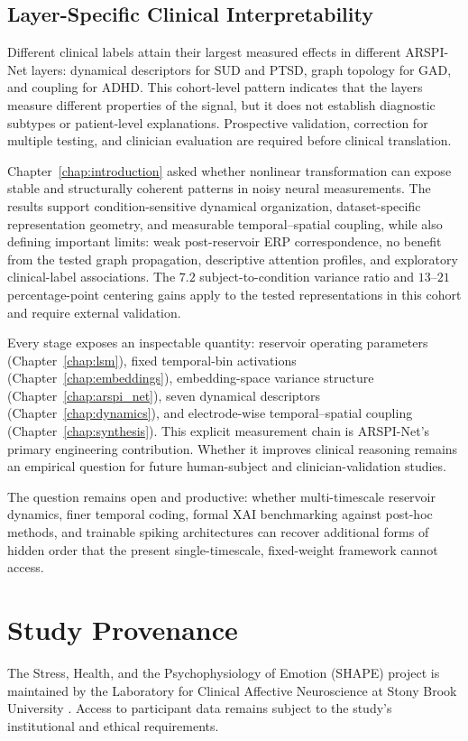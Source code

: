 \subsection{Layer-Specific Clinical Interpretability}

Different clinical labels attain their largest measured effects in different ARSPI-Net layers: dynamical descriptors for SUD and PTSD, graph topology for GAD, and coupling for ADHD. This cohort-level pattern indicates that the layers measure different properties of the signal, but it does not establish diagnostic subtypes or patient-level explanations. Prospective validation, correction for multiple testing, and clinician evaluation are required before clinical translation.

Chapter~\ref{chap:introduction} asked whether nonlinear transformation can expose stable and structurally coherent patterns in noisy neural measurements. The results support condition-sensitive dynamical organization, dataset-specific representation geometry, and measurable temporal--spatial coupling, while also defining important limits: weak post-reservoir ERP correspondence, no benefit from the tested graph propagation, descriptive attention profiles, and exploratory clinical-label associations. The $7.2$ subject-to-condition variance ratio and $13$--$21$ percentage-point centering gains apply to the tested representations in this cohort and require external validation.

Every stage exposes an inspectable quantity: reservoir operating parameters (Chapter~\ref{chap:lsm}), fixed temporal-bin activations (Chapter~\ref{chap:embeddings}), embedding-space variance structure (Chapter~\ref{chap:arspi_net}), seven dynamical descriptors (Chapter~\ref{chap:dynamics}), and electrode-wise temporal--spatial coupling (Chapter~\ref{chap:synthesis}). This explicit measurement chain is ARSPI-Net's primary engineering contribution. Whether it improves clinical reasoning remains an empirical question for future human-subject and clinician-validation studies.

The question remains open and productive: whether multi-timescale reservoir dynamics, finer temporal coding, formal XAI benchmarking against post-hoc methods, and trainable spiking architectures can recover additional forms of hidden order that the present single-timescale, fixed-weight framework cannot access.
\section{Study Provenance}

The Stress, Health, and the Psychophysiology of Emotion (SHAPE) project is maintained by the Laboratory for Clinical Affective Neuroscience at Stony Brook University \cite{noauthor_shape_2018}. Access to participant data remains subject to the study's institutional and ethical requirements.
